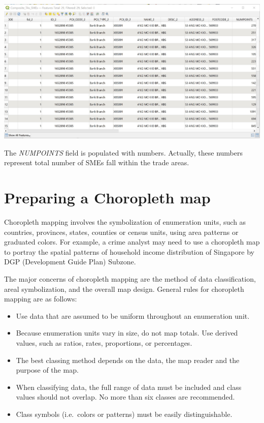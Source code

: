 \documentclass[
  letterpaper,
  DIV=11,
  numbers=noendperiod]{scrreprt}
\providecommand{\tightlist}{%
  \setlength{\itemsep}{0pt}\setlength{\parskip}{0pt}}\usepackage{longtable,booktabs,array}
\begin{document}
\includegraphics{./img05/image27.jpg}

The \emph{NUMPOINTS} field is populated with numbers. Actually, these
numbers represent total number of SMEs fall within the trade areas.

\hypertarget{preparing-a-choropleth-map}{%
\section{Preparing a Choropleth map}\label{preparing-a-choropleth-map}}

Choropleth mapping involves the symbolization of enumeration units, such
as countries, provinces, states, counties or census units, using area
patterns or graduated colors. For example, a crime analyst may need to
use a choropleth map to portray the spatial patterns of household income
distribution of Singapore by DGP (Development Guide Plan) Subzone.

The major concerns of choropleth mapping are the method of data
classification, areal symbolization, and the overall map design. General
rules for choropleth mapping are as follows:

\begin{itemize}
\tightlist
\item
  Use data that are assumed to be uniform throughout an enumeration
  unit.
\item
  Because enumeration units vary in size, do not map totals. Use derived
  values, such as ratios, rates, proportions, or percentages.
\item
  The best classing method depends on the data, the map reader and the
  purpose of the map.
\item
  When classifying data, the full range of data must be included and
  class values should not overlap. No more than six classes are
  recommended.
\item
  Class symbols (i.e.~colors or patterns) must be easily
  distinguishable.
\end{itemize}
\end{document}

